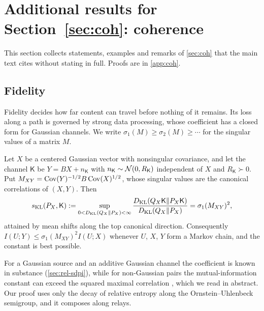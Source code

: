 \section{Additional results for \texorpdfstring{Section~\ref{sec:coh}}{Section 6}: coherence}\label{sup:coh}

This section collects statements, examples and remarks of \cref{sec:coh} that the main text cites without stating in full. Proofs are in \cref{app:coh}.

\subsection{Fidelity}\label{sec:coh-fidelity}

Fidelity decides how far content can travel before nothing of it remains. Its loss along a path is governed by strong data processing, whose coefficient has a closed form for Gaussian channels. We write $\sigma_1(M)\ge\sigma_2(M)\ge\cdots$ for the singular values of a matrix $M$.

\begin{proposition}\label{prop:coh-sdpi}
Let $X$ be a centered Gaussian vector with nonsingular covariance, and let the channel $\mathsf K$ be $Y=BX+n_{\mathsf K}$ with $n_{\mathsf K}\sim\mathcal{N}(0,R_{\mathsf K})$ independent of $X$ and $R_{\mathsf K}\succ0$. Put $M_{XY}=\operatorname{Cov}(Y)^{-1/2}B\operatorname{Cov}(X)^{1/2}$, whose singular values are the canonical correlations of $(X,Y)$. Then
\begin{equation}\label{eq:coh-sdpi}
s_{\mathrm{KL}}(P_X,\mathsf K):=\sup_{0<D_{\mathrm{KL}}(Q_X\Vert P_X)<\infty}\frac{D_{\mathrm{KL}}(Q_X\mathsf K\Vert P_X\mathsf K)}{D_{\mathrm{KL}}(Q_X\Vert P_X)}=\sigma_1(M_{XY})^2,
\end{equation}
attained by mean shifts along the top canonical direction. Consequently $I(U;Y)\le\sigma_1(M_{XY})^2I(U;X)$ whenever $U$, $X$, $Y$ form a Markov chain, and the constant is best possible.
\end{proposition}

For a Gaussian source and an additive Gaussian channel the coefficient is known in substance (\cref{sec:rel-sdpi}), while for non-Gaussian pairs the mutual-information constant can exceed the squared maximal correlation \citep{anantharam2013maximal}, which we read in abstract. Our proof uses only the decay of relative entropy along the Ornstein--Uhlenbeck semigroup, and it composes along relays.


